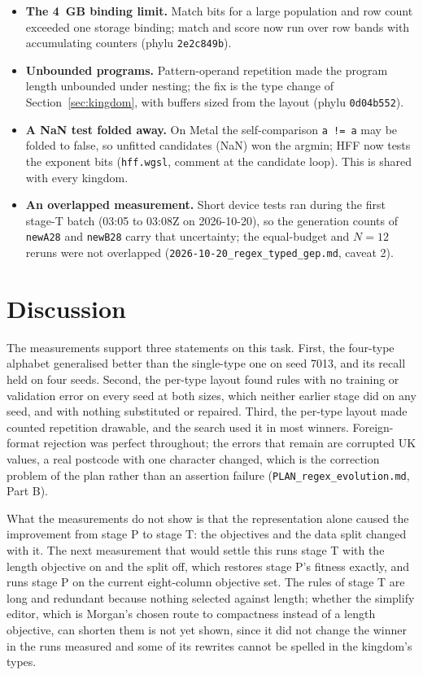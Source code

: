 \documentclass[sigconf,nonacm]{acmart}
\newcommand{\src}[1]{{\small\nolinkurl{#1}}}
\begin{document}
\begin{itemize}
this paper comes from that line.
\item \textbf{The 4~GB binding limit.} Match bits for a large population and row
count exceeded one storage binding; match and score now run over row bands with
accumulating counters (phylu \texttt{2e2c849b}).
\item \textbf{Unbounded programs.} Pattern-operand repetition made the program
length unbounded under nesting; the fix is the type change of
Section~\ref{sec:kingdom}, with buffers sized from the layout (phylu
\texttt{0d04b552}).
\item \textbf{A NaN test folded away.} On Metal the self-comparison
\texttt{a != a} may be folded to false, so unfitted candidates (NaN) won the
argmin; HFF now tests the exponent bits (\src{hff.wgsl}, comment at the
candidate loop). This is shared with every kingdom.
\item \textbf{An overlapped measurement.} Short device tests ran during the first
stage-T batch (03:05 to 03:08Z on 2026-10-20), so the generation counts of
\texttt{newA28} and \texttt{newB28} carry that uncertainty; the equal-budget and
$N=12$ reruns were not overlapped (\src{2026-10-20_regex_typed_gep.md}, caveat 2).
\end{itemize}

\section{Discussion}
\label{sec:discussion}

The measurements support three statements on this task. First, the four-type
alphabet generalised better than the single-type one on seed 7013, and its
recall held on four seeds. Second, the per-type layout found rules with no
training or validation error on every seed at both sizes, which neither earlier
stage did on any seed, and with nothing substituted or repaired. Third, the
per-type layout made counted repetition drawable, and the search used it in most
winners. Foreign-format rejection was perfect throughout; the errors that remain
are corrupted UK values, a real postcode with one character changed, which is the
correction problem of the plan rather than an assertion failure
(\src{PLAN_regex_evolution.md}, Part B).

What the measurements do not show is that the representation alone caused the
improvement from stage P to stage T: the objectives and the data split changed
with it. The next measurement that would settle this runs stage T with the
length objective on and the split off, which restores stage P's fitness exactly,
and runs stage P on the current eight-column objective set. The rules of stage T
are long and redundant because nothing selected against length; whether the
simplify editor, which is Morgan's chosen route to compactness instead of a length
objective, can shorten them is not yet shown, since it did not change the winner
in the runs measured and some of its rewrites cannot be spelled in the kingdom's
types.
\end{document}
